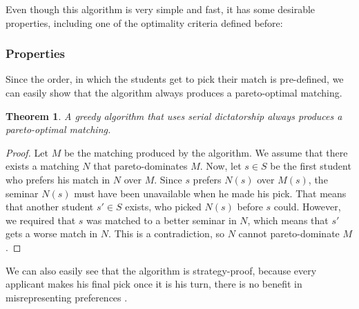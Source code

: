 Even though this algorithm is very simple and fast, it has some desirable properties, including one of the optimality criteria defined before:

\subsubsection{Properties}
Since the order, in which the students get to pick their match is pre-defined, we can easily show that the algorithm always produces a pareto-optimal matching.
\newtheorem{theorem}{Theorem}
\begin{theorem}
    A greedy algorithm that uses serial dictatorship always produces a pareto-optimal matching.
\end{theorem}
\begin{proof}
    Let $M$ be the matching produced by the algorithm. We assume that there exists a matching $N$ that pareto-dominates $M$. Now, let $s\in S$ be the first student who prefers his match in $N$ over $M$. Since $s$ prefers $N(s)$ over $M(s)$, the seminar $N(s)$ must have been unavailable when he made his pick. That means that another student $s' \in S$ exists, who picked $N(s)$ before $s$ could. However, we required that $s$ was matched to a better seminar in $N$, which means that $s'$ gets a worse match in $N$. This is a contradiction, so $N$ cannot pareto-dominate $M$ \cite{kun_2015}.
\end{proof}

We can also easily see that the algorithm is strategy-proof, because every applicant makes his final pick once it is his turn, there is no benefit in misrepresenting preferences \cite{Klaus}.

